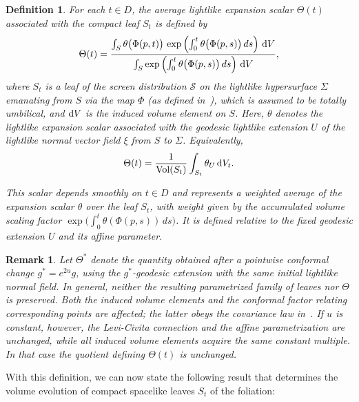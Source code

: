 \documentclass[11pt]{article}
\numberwithin{equation}{section}
\newtheorem{definition}[theorem]{Definition}
\newtheorem{remark}[theorem]{Remark}
\begin{document}
\begin{definition}\normalfont \label{def:average_expansion_scalar}
	For each $t \in D$, the \emph{average lightlike expansion scalar} $\Theta(t)$ associated with the compact leaf $S_t$ is defined by
	\[
	\Theta(t) = \frac{\int_S \theta\bigl(\Phi(p, t)\bigr)\, \exp\left( \int_0^t \theta\bigl(\Phi(p, s)\bigr)\, ds \right) \, {\rm d}V}{\int_S \exp\left( \int_0^t \theta\bigl(\Phi(p, s)\bigr)\, ds \right) \, {\rm d}V},
	\]
	where $S_t$ is a leaf of the screen distribution $\mathcal{S}$ on the lightlike hypersurface $\Sigma$ emanating from $S$ via the map $\Phi$ (as defined in~), which is assumed to be totally umbilical, and ${\rm d}V$ is the induced volume element on $S$. Here, $\theta$ denotes the lightlike expansion scalar associated with the geodesic lightlike extension $U$ of the lightlike normal vector field $\xi$ from $S$ to $\Sigma$.
	Equivalently,
	\[
		\Theta(t)=\frac{1}{\operatorname{Vol}(S_t)}
		\int_{S_t}\theta_U\,{\rm d}V_t.
	\]
	
	This scalar depends smoothly on $t \in D$ and represents a weighted average of the expansion scalar $\theta$ over the leaf $S_t$, with weight given by the accumulated volume scaling factor $\exp \bigl( \int_0^t \theta(\Phi(p, s))\, ds \bigr)$. It is defined relative to the fixed geodesic extension $U$ and its affine parameter.
\end{definition}
	


\begin{remark}\label{remark:Theta_conformal_dependence} \normalfont
	Let $\Theta^*$ denote the quantity obtained after a pointwise conformal change $g^*=e^{2u}g$, using the $g^*$-geodesic extension with the same initial lightlike normal field. In general, neither the resulting parametrized family of leaves nor $\Theta$ is preserved. Both the induced volume elements and the conformal factor relating corresponding points are affected; the latter obeys the covariance law in~. If $u$ is constant, however, the Levi-Civita connection and the affine parametrization are unchanged, while all induced volume elements acquire the same constant multiple. In that case the quotient defining $\Theta(t)$ is unchanged.
\end{remark}

	With this definition, we can now state the following result that determines the volume evolution of compact spacelike leaves $S_t$ of the foliation:
	
\end{document}

